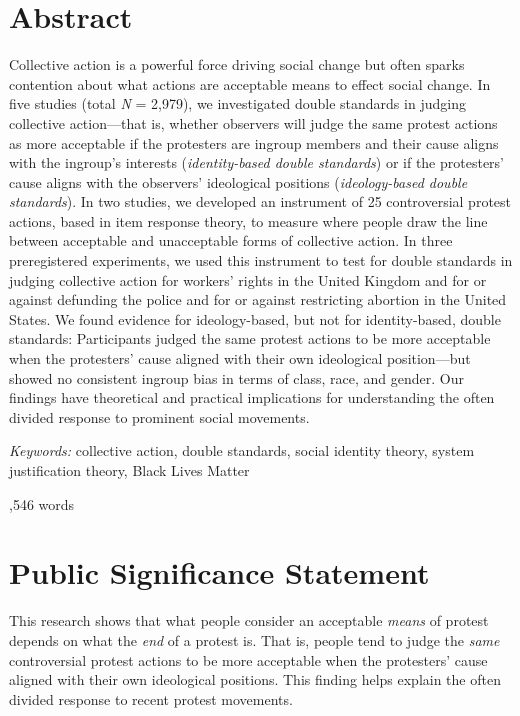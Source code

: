 \documentclass[12pt, letterpaper]{article}
\begin{document}
\section{Abstract}

\noindent Collective action is a powerful force driving social change
but often sparks contention about what actions are acceptable means to
effect social change. In five studies (total \emph{N} = 2,979), we
investigated double standards in judging collective action---that is,
whether observers will judge the same protest actions as more acceptable
if the protesters are ingroup members and their cause aligns with the
ingroup's interests (\emph{identity-based double standards}) or if the
protesters' cause aligns with the observers' ideological positions
(\emph{ideology-based double standards}). In two studies, we developed
an instrument of 25 controversial protest actions, based in item
response theory, to measure where people draw the line between
acceptable and unacceptable forms of collective action. In three
preregistered experiments, we used this instrument to test for double
standards in judging collective action for workers' rights in the United
Kingdom and for or against defunding the police and for or against
restricting abortion in the United States. We found evidence for
ideology-based, but not for identity-based, double standards:
Participants judged the same protest actions to be more acceptable when
the protesters' cause aligned with their own ideological position---but
showed no consistent ingroup bias in terms of class, race, and gender.
Our findings have theoretical and practical implications for
understanding the often divided response to prominent social movements.

\textit{Keywords:} collective action, double standards, social identity
theory, system justification theory, Black Lives Matter

\vfill

\begin{center}
,546 words
\end{center}

\vfill

\section{Public Significance Statement}

\noindent This research shows that what people consider an acceptable
\emph{means} of protest depends on what the \emph{end} of a protest is.
That is, people tend to judge the \emph{same} controversial protest
actions to be more acceptable when the protesters' cause aligned with
their own ideological positions. This finding helps explain the often
divided response to recent protest movements.
\end{document}
